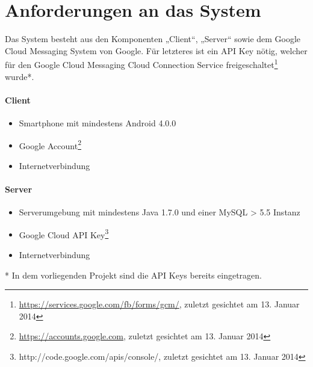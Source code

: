 
\section{Anforderungen an das System}

Das System besteht aus den Komponenten „Client“, „Server“ sowie dem Google Cloud Messaging System von Google. Für letzteres ist ein API Key nötig, welcher für den Google Cloud Messaging Cloud Connection Service freigeschaltet\footnote{\url{https://services.google.com/fb/forms/gcm/}, zuletzt gesichtet am 13. Januar 2014} wurde*.\\


\paragraph{Client}

\begin{itemize}
	\item Smartphone mit mindestens Android 4.0.0
	\item Google Account\footnote{\url{https://accounts.google.com}, zuletzt gesichtet am 13. Januar 2014}
	\item Internetverbindung
\end{itemize}

\paragraph{Server}

\begin{itemize}
	\item Serverumgebung mit mindestens Java 1.7.0 und einer MySQL > 5.5 Instanz
	\item Google Cloud API Key\footnote{http://code.google.com/apis/console‎/, zuletzt gesichtet am 13. Januar 2014}
	\item Internetverbindung
\end{itemize}

* In dem vorliegenden Projekt sind die API Keys bereits eingetragen.
